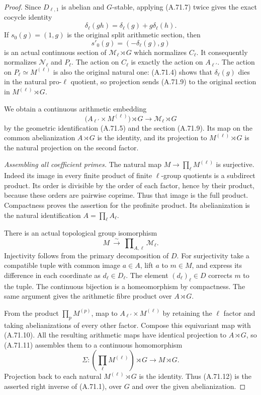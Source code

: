 \begin{proof}
Since $D_{\ell,1}$ is abelian and $G$-stable, applying (A.71.7)
twice gives the exact cocycle identity
\[
             \delta_\ell(gh)=\delta_\ell(g)+g\delta_\ell(h).
 \tag{A.71.8}
\]
If $s_0(g)=(1,g)$ is the original split arithmetic section, then
\[
                       s'_0(g)=(-\delta_\ell(g),g)
 \tag{A.71.9}
\]
is an actual continuous section of $\mathcal M_\ell\rtimes G$
which normalizes $C_\ell$.
It consequently normalizes $\mathcal N_\ell$ and $P_\ell$.
The action on $C_\ell$ is exactly the action on $A_{\ell'}$.
The action on $P_\ell\simeq M^{(\ell)}$ is also the original
natural one: (A.71.4) shows that $\delta_\ell(g)$ dies in the
natural pro-$\ell$ quotient, so projection sends (A.71.9) to
the original section in $M^{(\ell)}\rtimes G$.

We obtain a continuous arithmetic embedding
\[
 \bigl(A_{\ell'}\times M^{(\ell)}\bigr)\rtimes G
                   \longrightarrow\mathcal M_\ell\rtimes G
 \tag{A.71.10}
\]
by the geometric identification (A.71.5) and the section (A.71.9).
Its map on the common abelianization $A\rtimes G$ is the identity,
and its projection to $M^{(\ell)}\rtimes G$ is the natural projection
on the second factor.

\emph{Assembling all coefficient primes.}
The natural map $M\to\prod_\ell M^{(\ell)}$ is surjective.
Indeed its image in every finite product of finite
$\ell$-group quotients is a subdirect product.
Its order is divisible by the order of each factor, hence by their
product, because these orders are pairwise coprime.
Thus that image is the full product.  Compactness proves the assertion
for the profinite product.
Its abelianization is the natural identification
$A=\prod_\ell A_\ell$.

There is an actual topological group isomorphism
\[
 M\ \xrightarrow{\sim}\
       \prod\nolimits_{A,\ell}\mathcal M_\ell .
 \tag{A.71.11}
\]
Injectivity follows from the primary decomposition of $D$.
For surjectivity take a compatible tuple with common image $a\in A$,
lift $a$ to $m\in M$, and express its difference in each coordinate
as $d_\ell\in D_\ell$.  The element
$(d_\ell)_\ell\in D$ corrects $m$ to the tuple.
The continuous bijection is a homeomorphism by compactness.
The same argument gives the arithmetic fibre product over
$A\rtimes G$.

From the product $\prod_pM^{(p)}$, map to
$A_{\ell'}\times M^{(\ell)}$ by retaining the $\ell$ factor and
taking abelianizations of every other factor.
Compose this equivariant map with (A.71.10).
All the resulting arithmetic maps have identical projection to
$A\rtimes G$, so (A.71.11) assembles them to a continuous
homomorphism
\[
 \Sigma:\left(\prod_\ell M^{(\ell)}\right)\rtimes G
                                      \longrightarrow M\rtimes G .
 \tag{A.71.12}
\]
Projection back to each natural $M^{(\ell)}\rtimes G$ is the identity.
Thus (A.71.12) is the asserted right inverse of (A.71.1), over $G$
and over the given abelianization.


\end{proof}
